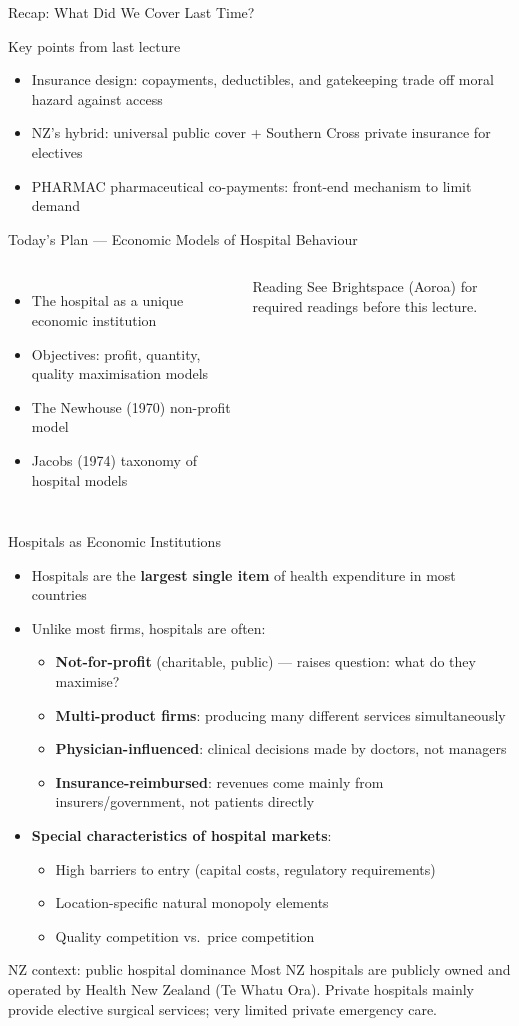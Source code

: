 \documentclass[aspectratio=169, 12pt]{beamer}
\newcommand{\recapslide}[1]{%
  \begin{frame}{Recap: What Did We Cover Last Time?}
    \begin{block}{Key points from last lecture}
      \begin{itemize}#1\end{itemize}
    \end{block}
  \end{frame}}
\newcommand{\planslide}[2]{%
  \begin{frame}{Today's Plan — #1}
    \begin{columns}
      \column{0.6\textwidth}
      \begin{itemize}#2\end{itemize}
      \column{0.38\textwidth}
      \begin{alertblock}{Reading}
        \footnotesize See Brightspace (Aoroa) for required readings before this lecture.
      \end{alertblock}
    \end{columns}
  \end{frame}}
\begin{document}
\recapslide{
  \item Insurance design: copayments, deductibles, and gatekeeping trade off moral hazard against access
  \item NZ's hybrid: universal public cover + Southern Cross private insurance for electives
  \item PHARMAC pharmaceutical co-payments: front-end mechanism to limit demand
}

\planslide{Economic Models of Hospital Behaviour}{
  \item The hospital as a unique economic institution
  \item Objectives: profit, quantity, quality maximisation models
  \item The Newhouse (1970) non-profit model
  \item Jacobs (1974) taxonomy of hospital models
}

\begin{frame}{Hospitals as Economic Institutions}
  \begin{itemize}
    \item Hospitals are the \textbf{largest single item} of health expenditure in most countries
    \item Unlike most firms, hospitals are often:
    \begin{itemize}
      \item \textbf{Not-for-profit} (charitable, public) --- raises question: what do they maximise?
      \item \textbf{Multi-product firms}: producing many different services simultaneously
      \item \textbf{Physician-influenced}: clinical decisions made by doctors, not managers
      \item \textbf{Insurance-reimbursed}: revenues come mainly from insurers/government, not patients directly
    \end{itemize}
    \item \textbf{Special characteristics of hospital markets}:
    \begin{itemize}
      \item High barriers to entry (capital costs, regulatory requirements)
      \item Location-specific natural monopoly elements
      \item Quality competition vs.\ price competition
    \end{itemize}
  \end{itemize}
  \begin{exampleblock}{NZ context: public hospital dominance}
    Most NZ hospitals are publicly owned and operated by Health New Zealand (Te Whatu Ora).
    Private hospitals mainly provide elective surgical services; very limited private emergency care.
  \end{exampleblock}
\end{frame}
\end{document}
